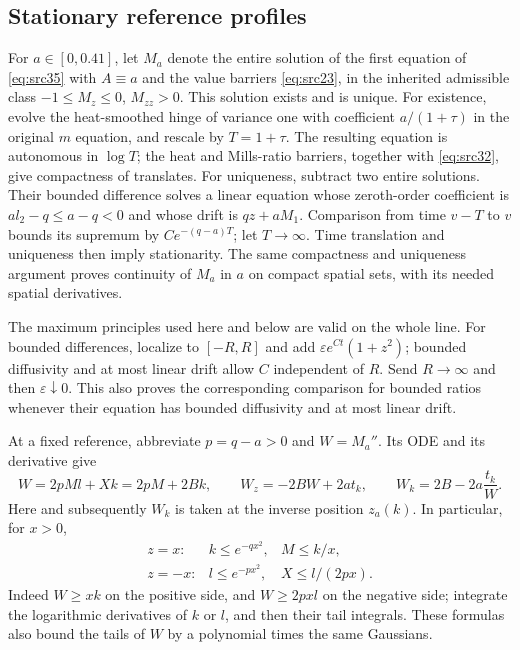 \documentclass[11pt,a4paper]{article}
\numberwithin{equation}{section}
\theoremstyle{definition}
\theoremstyle{remark}
\begin{document}
\subsection{Stationary reference profiles}

For $a\in[0,0.41]$, let $M_a$ denote the entire solution of the first
equation of \eqref{eq:src35} with $A\equiv a$ and the value barriers
\eqref{eq:src23}, in the inherited admissible class
$-1\le M_z\le0$, $M_{zz}>0$.  This solution exists and is unique.
For existence,
evolve the heat-smoothed hinge of variance one with coefficient
$a/(1+\tau)$ in the original $m$ equation, and rescale by
$T=1+\tau$.  The resulting equation is autonomous in $\log T$; the
heat and Mills-ratio barriers, together with \eqref{eq:src32}, give
compactness of translates.  For uniqueness, subtract two entire
solutions.  Their bounded difference solves a linear equation whose
zeroth-order coefficient is $al_2-q\le a-q<0$ and whose drift is
$qz+aM_1$.  Comparison from time $v-T$ to $v$ bounds its supremum by
$Ce^{-(q-a)T}$; let $T\to\infty$.  Time translation and uniqueness
then imply stationarity.  The same compactness and uniqueness argument
proves continuity of $M_a$ in $a$ on compact spatial sets, with its
needed spatial derivatives.

The maximum principles used here and below are valid on the whole
line.  For bounded differences, localize to $[-R,R]$ and add
$\varepsilon e^{Ct}(1+z^2)$; bounded diffusivity and at most linear
drift allow $C$ independent of $R$.  Send $R\to\infty$ and then
$\varepsilon\downarrow0$.  This also proves the corresponding
comparison for bounded ratios whenever their equation has bounded
diffusivity and at most linear drift.

At a fixed reference, abbreviate $p=q-a>0$ and $W=M_a''$.  Its ODE
and its derivative give
\begin{equation}
 W=2pMl+Xk=2pM+2Bk,\qquad
 W_z=-2BW+2at_k,\qquad
 W_k=2B-2a\frac{t_k}{W}.
 \label{eq:src40}
\end{equation}
Here and subsequently $W_k$ is taken at the inverse position
$z_a(k)$.  In particular, for $x>0$,
\[
 \begin{array}{lll}
 z=x: & k\le e^{-qx^2},& M\le k/x,\\
 z=-x:& l\le e^{-px^2},& X\le l/(2px).
 \end{array}
\]
Indeed $W\ge xk$ on the positive side, and $W\ge2pxl$ on the
negative side; integrate the logarithmic derivatives of $k$ or $l$,
and then their tail integrals.  These formulas also bound the tails
of $W$ by a polynomial times the same Gaussians.
\end{document}
